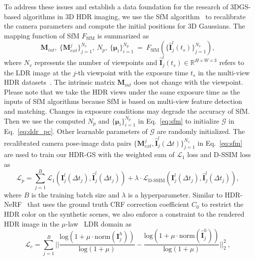 \documentclass{article}
\begin{document}
To address these issues and establish a data foundation for the research of 3DGS-based algorithms in 3D HDR imaging, we use the SfM algorithm~\cite{sfm} to recalibrate the camera parameters and compute the initial positions for 3D Gaussians. The mapping function of SfM $F_{\text{SfM}}$ is summarized as
\begin{equation}
    \mathbf{M}_{int},~\{\mathbf{M}_{ext}^j\}_{j=1}^{N_v},~N_p,~\{ \bm{\mu}_i\}_{i=1}^{N_p}~=~F_{\text{SfM}} (\{\hat{\mathbf{I}}^l_j(t_s)\}_{j=1}^{N_v}),
    \label{eq:sfm}
\end{equation}
where $N_v$ represents the number of viewpoints and $\hat{\mathbf{I}}_j^l (t_s) \in \mathbb{R}^{H\times W\times 3}$ refers to the LDR image at the $j$-th viewpoint with the exposure time $t_s$ in the multi-view HDR datasets~\cite{hdr_nerf}. The intrinsic matrix $\mathbf{M}_{int}$ does not change with the viewpoint. Please note that we take the HDR views under the same exposure time as the inputs of SfM algorithms because SfM is based on multi-view feature detection and matching. Changes in exposure conditions may degrade the accuracy of SfM. Then we use the computed $N_p$ and $\{ \bm{\mu}_i\}_{i=1}^{N_p}$ in Eq.~\eqref{eq:sfm} to initialize $\mathcal{G}$ in Eq.~\eqref{eq:ddr_pc}. Other learnable parameters of $\mathcal{G}$ are randomly initialized. The recalibrated camera pose-image data pairs $\{\mathbf{M}_{ext}^j, \hat{\mathbf{I}}^l_j(\Delta t)\}_{j=1}^{N_v}$ in Eq.~\eqref{eq:sfm} are used to train our HDR-GS with the weighted sum of $\mathcal{L}_1$ loss and D-SSIM loss as
\begin{equation}
    \mathcal{L}_p = \sum_{j=1}^{B} \mathcal{L}_1 (\mathbf{I}^l_j(\Delta t_j), \hat{\mathbf{I}}^l_j(\Delta t_j)) + \lambda \cdot \mathcal{L}_{\text{D-SSIM}} (\mathbf{I}^l_j(\Delta t_j), \hat{\mathbf{I}}^l_j(\Delta t_j)),
    \label{eq:loss_p}
\end{equation}
where $B$ is the training batch size and $\lambda$ is a hyperparameter. Similar to HDR-NeRF~\cite{hdr_nerf} that uses the ground truth CRF correction coefficient $C_0$ to restrict the HDR color on the synthetic scenes, we also enforce a constraint to the rendered HDR image in the $\mu$-law~\cite{hdr_26, hdr_45, hdr_62, hdr_nerf} LDR domain as
\begin{equation}
    \mathcal{L}_c = \sum_{j=1}^{B} \Big|\Big|\frac{\text{log}(1+\mu \cdot \text{norm}(\mathbf{I}^h_{j}))}{\text{log}(1+\mu)} - \frac{\text{log}(1+\mu \cdot \text{norm}(\hat{\mathbf{I}}^h_{j}))}{\text{log}(1+\mu)}\Big|\Big|_2^2 ~,
    \label{eq:loss_c}
\end{equation}
\end{document}
